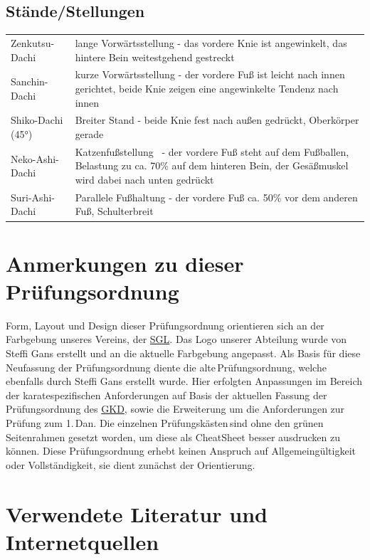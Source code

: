 		\subsection{Stände/Stellungen}
			\begin{tabularx}{\textwidth}{p{100pt}X}
				Zenkutsu-Dachi		&	lange Vorwärtsstellung - das vordere Knie ist angewinkelt, das hintere Bein weitestgehend gestreckt\\
				Sanchin-Dachi		&	kurze Vorwärtsstellung - der vordere Fuß ist leicht nach innen gerichtet, beide Knie zeigen eine angewinkelte Tendenz nach innen\\
				Shiko-Dachi (45°)	& Breiter Stand - beide Knie fest nach außen gedrückt, Oberkörper gerade\\
				Neko-Ashi-Dachi		&	\frqq Katzenfußstellung\flqq~ - der vordere Fuß steht auf dem Fußballen, Belastung zu ca. 70\% auf dem hinteren Bein, der Gesäßmuskel wird dabei nach unten gedrückt\\
				Suri-Ashi-Dachi		&	Parallele Fußhaltung - der vordere Fuß ca. 50\% vor dem anderen Fuß, Schulterbreit\\
			\end{tabularx}
	\section{Anmerkungen zu dieser Prüfungsordnung}
		Form, Layout und Design dieser Prüfungsordnung orientieren sich an der Farbgebung unseres Vereins, der \href{https://www.sglangenfeld.de/}{SGL}. Das Logo unserer Abteilung wurde von Steffi Gans erstellt und an die aktuelle Farbgebung angepasst. Als Basis für diese Neufassung der Prüfungsordnung diente die \frqq alte\flqq\,Prüfungsordnung, welche ebenfalls durch Steffi Gans erstellt wurde. Hier erfolgten Anpassungen im Bereich der karatespezifischen Anforderungen auf Basis der aktuellen Fassung der Prüfungsordnung des \href{https://www.karate-gkd.de/}{GKD}, sowie die Erweiterung um die Anforderungen zur Prüfung zum 1.\,Dan. Die einzelnen \frqq Prüfungskästen\flqq \,sind ohne den grünen Seitenrahmen gesetzt worden, um diese als CheatSheet besser ausdrucken zu können. Diese Prüfungsordnung erhebt keinen Anspruch auf Allgemeingültigkeit oder Vollständigkeit, sie dient zunächst der Orientierung.
	\section{Verwendete Literatur und Internetquellen}
		\printbibliography[heading=none]